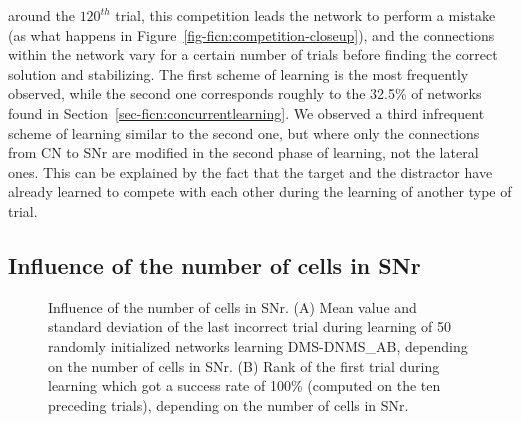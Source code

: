 \documentclass[
  11pt,
  a4paper,
]{scrbook}
\begin{document}
around the \(120^{th}\) trial, this competition leads the network to
perform a mistake (as what happens in
Figure~\ref{fig-ficn:competition-closeup}), and the connections within
the network vary for a certain number of trials before finding the
correct solution and stabilizing. The first scheme of learning is the
most frequently observed, while the second one corresponds roughly to
the 32.5\% of networks found in
Section~\ref{sec-ficn:concurrentlearning}. We observed a third
infrequent scheme of learning similar to the second one, but where only
the connections from CN to SNr are modified in the second phase of
learning, not the lateral ones. This can be explained by the fact that
the target and the distractor have already learned to compete with each
other during the learning of another type of trial.

\subsection{Influence of the number of cells in
SNr}\label{sec-ficn:numbercells}

\begin{figure}


\caption{\label{fig-ficn:parallellearning}Influence of the number of
cells in SNr. (A) Mean value and standard deviation of the last
incorrect trial during learning of 50 randomly initialized networks
learning DMS-DNMS\_AB, depending on the number of cells in SNr. (B) Rank
of the first trial during learning which got a success rate of 100\%
(computed on the ten preceding trials), depending on the number of cells
in SNr.}

\end{figure}%
\end{document}
